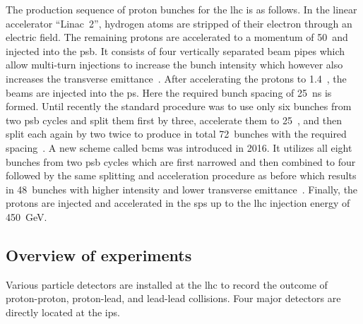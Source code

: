 
The production sequence of proton bunches for the \gls{lhc} is as follows. In the linear accelerator ``Linac~2'', hydrogen atoms are stripped of their electron through an electric field. The remaining protons are accelerated to a momentum of 50~\MeV and injected into the \gls{psb}. It consists of four vertically separated beam pipes which allow multi-turn injections to increase the bunch intensity which however also increases the transverse emittance~\cite{doi:10.1142/S0217751X13300196}. After accelerating the protons to 1.4~\GeV, the beams are injected into the \gls{ps}. Here the required bunch spacing of 25~ns is formed. Until recently the standard procedure was to use only six bunches from two \gls{psb} cycles and split them first by three, accelerate them to 25~\GeV, and then split each again by two twice to produce in total 72~bunches with the required spacing~\cite{Benedikt:2001ar}. A new scheme called \gls{bcms} was introduced in 2016. It utilizes all eight bunches from two \gls{psb} cycles which are first narrowed and then combined to four followed by the same splitting and acceleration procedure as before which results in 48~bunches with higher intensity and lower transverse emittance~\cite{bcms}. Finally, the protons are injected and accelerated in the \gls{sps} up to the \gls{lhc} injection energy of 450~GeV.


\subsection{Overview of experiments}

Various particle detectors are installed at the \gls{lhc} to record the outcome of proton-proton, proton-lead, and lead-lead collisions. Four major detectors are directly located at the \glspl{ip}. 

